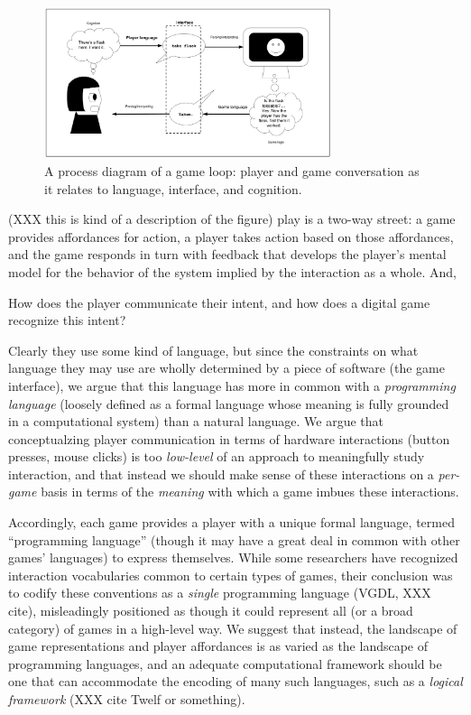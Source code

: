 \documentclass[sigconf]{acmart}
\begin{document}
\begin{figure}
\includegraphics[width=0.75\textwidth]{conversation-processing.png}
\caption{A process diagram of a game loop: player and game conversation as
it relates to language, interface, and cognition.}
\end{figure}

(XXX this is kind of a description of the figure)
play is a two-way street: a game provides affordances for action, a player
takes action based on those affordances, and the game responds in turn with
feedback that develops the player's mental model for the behavior of the system
implied by the interaction as a whole. And, 

How does the player communicate their intent, and how does a
digital game recognize this intent?

Clearly they use some kind of language, but since the constraints on what
language they may use are wholly determined by a piece of software (the
game interface), we argue that this language has more in common with a {\em
programming language} (loosely defined as a formal language whose meaning
is fully grounded in a computational system) than a natural language. We
argue that conceptualzing player communication in terms of hardware
interactions (button presses, mouse clicks) is too {\em low-level} of an
approach to meaningfully study interaction, and that instead we should make
sense of these interactions on a {\em per-game} basis in terms of the {\em
meaning} with which a game imbues these interactions. 

Accordingly, each game provides a player with a unique formal language,
termed ``programming language'' (though it may have a great deal in common
with other games' languages) to express themselves. While some researchers
have recognized interaction vocabularies common to certain types of games,
their conclusion was to codify these conventions as a {\em single}
programming language (VGDL, XXX cite), misleadingly positioned as though it
could represent all (or a broad category) of games in a high-level way.
We suggest that instead, the landscape of game representations and player
affordances is as varied as the landscape of programming languages, and an
adequate computational framework should be one that can accommodate the
encoding of many such languages, such as a {\em logical framework} (XXX
cite Twelf or something).
\end{document}
